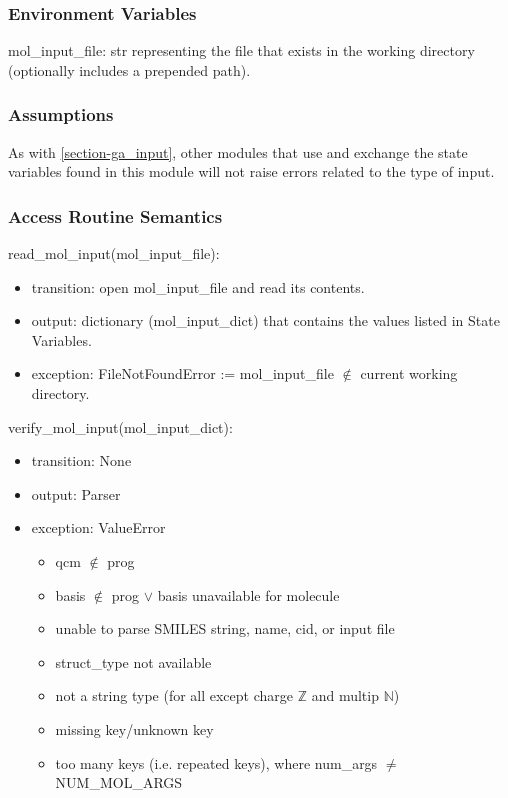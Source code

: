 \documentclass[12pt, titlepage]{article}
\begin{document}

\subsubsection{Environment Variables}

mol\_input\_file: str representing the file that exists in the working 
directory (optionally includes a prepended path).

\subsubsection{Assumptions}

As with \ref{section-ga_input}, other modules that use and exchange the state 
variables found in this module will not raise errors related to the type of 
input.

\subsubsection{Access Routine Semantics}

\noindent read\_mol\_input(mol\_input\_file):
\begin{itemize}
	\item transition: open mol\_input\_file and read its contents.
	\item output: dictionary (mol\_input\_dict) that contains the values listed 
	in State Variables.
	\item exception: FileNotFoundError := mol\_input\_file $\notin$ current 
	working directory.
\end{itemize}

\noindent verify\_mol\_input(mol\_input\_dict):
\begin{itemize}
	\item transition: None
	\item output: Parser
	\item exception: ValueError
	\begin{itemize}
		\item qcm $\notin$ prog
		\item basis $\notin$ prog $\lor$ basis unavailable for molecule
		\item unable to parse SMILES string, name, cid, or input file
		\item struct\_type not available
		\item not a string type (for all except charge $\mathbb{Z}$ and multip 
		$\mathbb{N}$)
		\item missing key/unknown key
		\item too many keys (i.e. repeated keys), where num\_args $\neq$ 
		NUM\_MOL\_ARGS
	\end{itemize}
\end{itemize}
\end{document}
